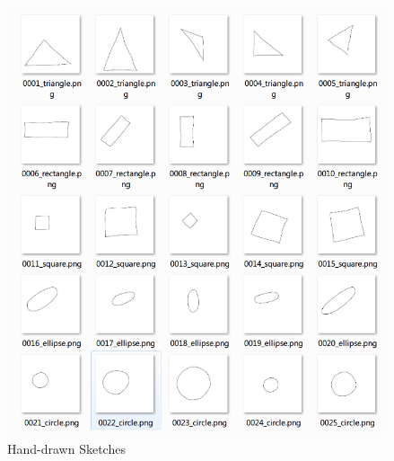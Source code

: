 \begin{figure}[ht!]
\includegraphics[width=\columnwidth]{Figure_2_Sketch_Image.png}
\caption{Hand-drawn Sketches}
\end{figure}

